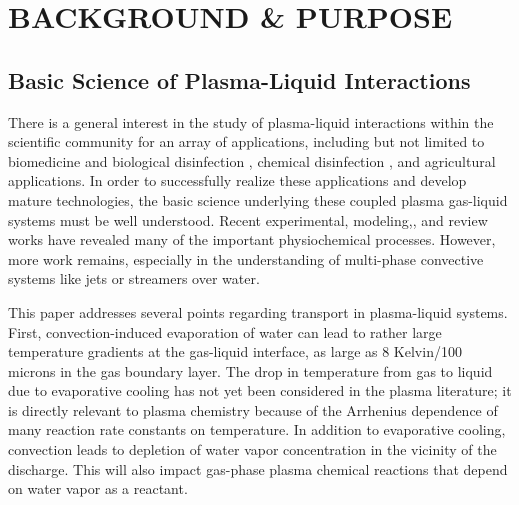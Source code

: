 \chapter{BACKGROUND \& PURPOSE}
\label{chap-one}

\section{Basic Science of Plasma-Liquid Interactions}
\label{sec:intro_plasliq}

There is a general interest in the study of plasma-liquid interactions within the
scientific community for an array of applications, including but not limited to biomedicine and biological disinfection \cite{Kong2009b,Laroussi2009,Shimizu2014c,VonWoedtke2014a,VonWoedtke2013a,Joubert2013a}, chemical disinfection \cite{Johnson2006,Locke2006,Theron2008}, and agricultural applications. \cite{Park2013b,Lindsay2014} In order to successfully realize these applications and develop mature technologies, the basic science underlying these coupled plasma gas-liquid systems must be well understood. Recent experimental,\cite{Lukes2014b,Bruggeman2009d,Pavlovich2013g,Traylor2011h,yagi2015two,bruggeman2008dc} modeling,\cite{Babaeva2014b,Tian2014,Chen2014a}, and review works \cite{locke2011review,bruggeman2009non} have revealed many of the important physiochemical processes. However, more work remains, especially in the understanding of multi-phase convective systems like jets or streamers over water.

This paper addresses several points regarding transport in plasma-liquid systems. First, convection-induced evaporation of water can lead to rather large temperature gradients at the gas-liquid interface, as large as 8 Kelvin/100 microns in the gas boundary layer. The drop in temperature from gas to liquid due to evaporative cooling has not yet been considered in the plasma literature; it is directly relevant to plasma chemistry because of the Arrhenius dependence of many reaction rate constants on temperature. In addition to evaporative cooling, convection leads to depletion of water vapor concentration in the vicinity of the discharge. This will also impact gas-phase plasma chemical reactions that depend on water vapor as a reactant. \cite{winter2013feed}

